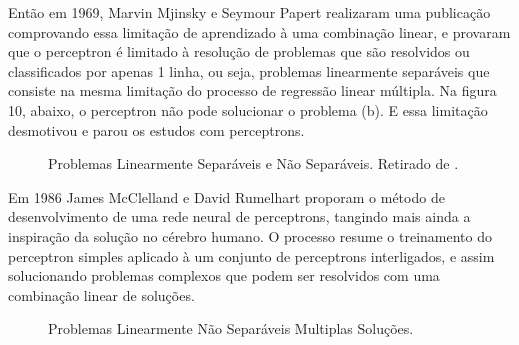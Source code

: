 \documentclass[	12pt, Times, openright, twoside, a4paper, english, brazil]{abntex2}
\begin{document}
          Então em 1969, Marvin Mjinsky e Seymour Papert realizaram uma publicação comprovando essa limitação de aprendizado à uma combinação linear, e provaram que o perceptron é limitado à resolução de problemas que são resolvidos ou classificados por apenas 1 linha, ou seja, problemas linearmente separáveis que consiste na mesma limitação do processo de regressão linear múltipla.
          Na figura 10, abaixo, o perceptron não pode solucionar o problema (b). E essa limitação desmotivou e parou os estudos com perceptrons.
		  \begin{figure}[!ht]
		  	\caption{Problemas Linearmente Separáveis e Não Separáveis. Retirado de \cite{Flavia2014}.\label{fig:problemasLineares}}
		  \end{figure}
	  	
	  	  Em 1986 James McClelland e David Rumelhart proporam o método de desenvolvimento de uma rede neural de perceptrons, tangindo mais ainda a inspiração da solução no cérebro humano. O processo resume o treinamento do perceptron simples aplicado à um conjunto de perceptrons interligados, e assim solucionando problemas complexos que podem ser resolvidos com uma combinação linear de soluções.
	  	  
	  	  \begin{figure}[!ht]
	  	  	\caption{Problemas Linearmente Não Separáveis Multiplas Soluções. \label{fig:doisPerceptrons}}
	  	  \end{figure}
  	       
\end{document}
